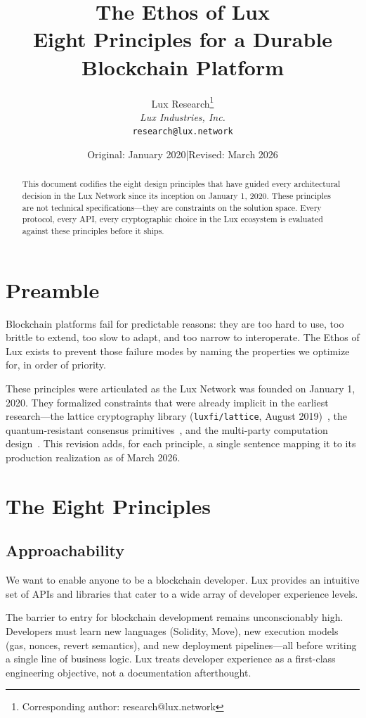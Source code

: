 \documentclass[11pt,a4paper]{article}
\title{The Ethos of Lux\\[4pt]
\large Eight Principles for a Durable Blockchain Platform}
\author{
Lux Research\thanks{Corresponding author: research@lux.network}\\
\textit{Lux Industries, Inc.}\\
\texttt{research@lux.network}
}
\date{Original: January 2020\quad|\quad Revised: March 2026}
\begin{document}
\luxcoverpage

\begin{abstract}
This document codifies the eight design principles that have guided
every architectural decision in the Lux Network since its inception on
January 1, 2020. These principles are not technical
specifications---they are constraints on the solution space. Every
protocol, every API, every cryptographic choice in the Lux ecosystem
is evaluated against these principles before it ships.
\end{abstract}

\tableofcontents
\newpage

\section{Preamble}

Blockchain platforms fail for predictable reasons: they are too hard to
use, too brittle to extend, too slow to adapt, and too narrow to
interoperate. The Ethos of Lux exists to prevent those failure modes by
naming the properties we optimize for, in order of priority.

These principles were articulated as the Lux Network was founded on
January 1, 2020. They formalized constraints that were already implicit
in the earliest research---the lattice cryptography library
(\texttt{luxfi/lattice}, August 2019)~\cite{lux-lattice}, the quantum-resistant consensus
primitives~\cite{lux-consensus}, and the multi-party computation design~\cite{lux-mpc}. This revision adds,
for each principle, a single sentence mapping it to its production
realization as of March 2026.

\section{The Eight Principles}

\subsection{Approachability}

We want to enable anyone to be a blockchain developer. Lux provides an
intuitive set of APIs and libraries that cater to a wide array of
developer experience levels.

The barrier to entry for blockchain development remains unconscionably
high. Developers must learn new languages (Solidity, Move), new
execution models (gas, nonces, revert semantics), and new deployment
pipelines---all before writing a single line of business logic. Lux
treats developer experience as a first-class engineering objective,
not a documentation afterthought.
\end{document}
